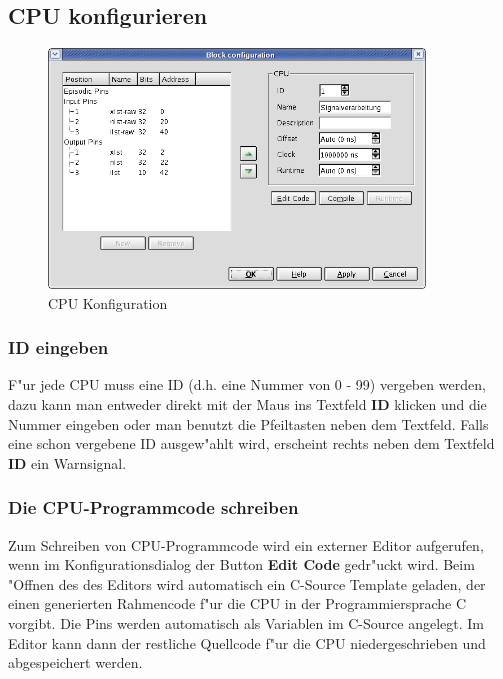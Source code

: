 \documentclass[a4paper,titlepage,12pt,ngerman]{scrbook}
\begin{document}
\newpage
\subsection{CPU konfigurieren}
\begin{figure}[htbp]

\begin{center}

\includegraphics[width=10cm]{CPUConfiguration}

\caption{CPU Konfiguration}\label{test}

\end{center}

\end{figure}
\subsubsection{ID eingeben}
F"ur jede CPU muss eine ID (d.h. eine Nummer von 0 - 99) vergeben werden, dazu kann man entweder direkt mit der Maus ins Textfeld {\bf ID} klicken und die Nummer eingeben oder man benutzt die Pfeiltasten neben dem Textfeld. Falls eine schon vergebene ID ausgew"ahlt wird, erscheint rechts neben dem Textfeld {\bf ID} ein Warnsignal.

\subsubsection{Die CPU-Programmcode schreiben}
Zum Schreiben von CPU-Programmcode wird ein externer Editor aufgerufen, wenn im Konfigurationsdialog der Button {\bf Edit Code} gedr"uckt wird. Beim "Offnen des des Editors wird automatisch ein C-Source Template geladen, der einen generierten Rahmencode f"ur die CPU in der Programmiersprache C vorgibt. Die Pins werden automatisch als Variablen im C-Source angelegt. Im Editor kann dann der restliche Quellcode f"ur die CPU niedergeschrieben und abgespeichert werden.
\end{document}
